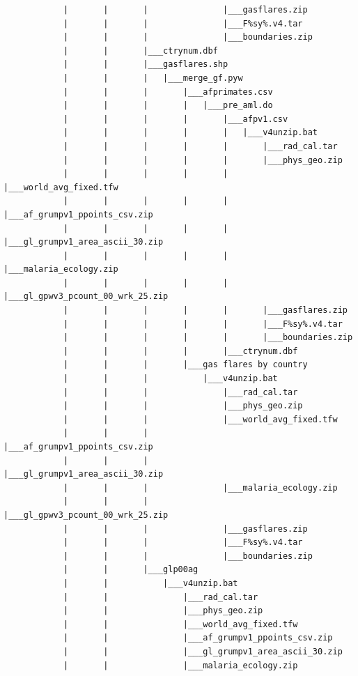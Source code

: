 \documentclass[
]{book}
\begin{document}
\begin{verbatim}
            |       |       |               |___gasflares.zip
            |       |       |               |___F%sy%.v4.tar
            |       |       |               |___boundaries.zip
            |       |       |___ctrynum.dbf
            |       |       |___gasflares.shp
            |       |       |   |___merge_gf.pyw
            |       |       |       |___afprimates.csv
            |       |       |       |   |___pre_aml.do
            |       |       |       |       |___afpv1.csv
            |       |       |       |       |   |___v4unzip.bat
            |       |       |       |       |       |___rad_cal.tar
            |       |       |       |       |       |___phys_geo.zip
            |       |       |       |       |       |___world_avg_fixed.tfw
            |       |       |       |       |       |___af_grumpv1_ppoints_csv.zip
            |       |       |       |       |       |___gl_grumpv1_area_ascii_30.zip
            |       |       |       |       |       |___malaria_ecology.zip
            |       |       |       |       |       |___gl_gpwv3_pcount_00_wrk_25.zip
            |       |       |       |       |       |___gasflares.zip
            |       |       |       |       |       |___F%sy%.v4.tar
            |       |       |       |       |       |___boundaries.zip
            |       |       |       |       |___ctrynum.dbf
            |       |       |       |___gas flares by country
            |       |       |           |___v4unzip.bat
            |       |       |               |___rad_cal.tar
            |       |       |               |___phys_geo.zip
            |       |       |               |___world_avg_fixed.tfw
            |       |       |               |___af_grumpv1_ppoints_csv.zip
            |       |       |               |___gl_grumpv1_area_ascii_30.zip
            |       |       |               |___malaria_ecology.zip
            |       |       |               |___gl_gpwv3_pcount_00_wrk_25.zip
            |       |       |               |___gasflares.zip
            |       |       |               |___F%sy%.v4.tar
            |       |       |               |___boundaries.zip
            |       |       |___glp00ag
            |       |           |___v4unzip.bat
            |       |               |___rad_cal.tar
            |       |               |___phys_geo.zip
            |       |               |___world_avg_fixed.tfw
            |       |               |___af_grumpv1_ppoints_csv.zip
            |       |               |___gl_grumpv1_area_ascii_30.zip
            |       |               |___malaria_ecology.zip

\end{verbatim}
\end{document}
